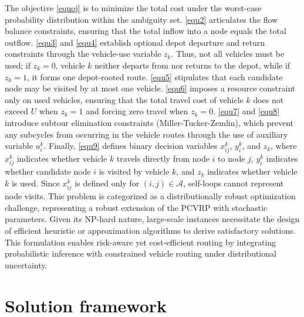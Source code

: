 \documentclass[preprint,12pt,authoryear]{elsarticle}
\theoremstyle{definition}
\begin{document}
The objective \eqref{equoj} is to minimize the total cost under the worst-case probability distribution within the ambiguity set.  \eqref{equ2} articulates the flow balance constraints, ensuring that the total inflow into a node equals the total outflow. 
 \eqref{equ3} and \eqref{equ4} establish optional depot departure and return constraints through the vehicle-use variable $z_k$. Thus, not all vehicles must be used; if $z_k=0$, vehicle $k$ neither departs from nor returns to the depot, while if $z_k=1$, it forms one depot-rooted route.
 \eqref{equ5} stipulates that each candidate node may be visited by at most one vehicle. 
 \eqref{equ6} imposes a resource constraint only on used vehicles, ensuring that the total travel cost of vehicle $k$ does not exceed $U$ when $z_k=1$ and forcing zero travel when $z_k=0$.
\eqref{equ7} and \eqref{equ8} introduce subtour elimination constraints (Miller-Tucker-Zemlin), which prevent any subcycles from occurring in the vehicle routes through the use of auxiliary variable \(u_i^k\). 
Finally, \eqref{equ9} defines binary decision variables \(x_{ij}^k\), \(y_i^k\), and \(z_k\), where \(x_{ij}^k\) indicates whether vehicle \(k\) travels directly from node \(i\) to node \(j\), \(y_i^k\) indicates whether candidate node \(i\) is visited by vehicle \(k\), and \(z_k\) indicates whether vehicle $k$ is used. Since $x_{ij}^k$ is defined only for $(i,j)\in\mathcal{A}$, self-loops cannot represent node visits.
This problem is categorized as a distributionally robust optimization challenge, representing a robust extension of the PCVRP with stochastic parameters. Given its NP-hard nature, large-scale instances necessitate the design of efficient heuristic or approximation algorithms to derive satisfactory solutions. This formulation enables risk-aware yet cost-efficient routing by integrating probabilistic inference with constrained vehicle routing under distributional uncertainty.


\section{Solution framework}\label{sec4}
\end{document}
